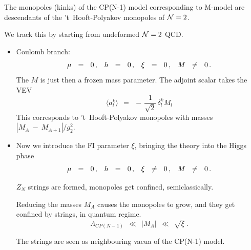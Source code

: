 \documentclass[12pt,letterpaper,landscape,KOMA,smallheadings,calcdimensions,display]{powersem}
\begin{document}
\begin{slide}

	The monopoles (kinks) of the CP(N-1) model corresponding to M-model are descendants
	of the 't~Hooft-Polyakov monopoles of $ \mathcal{N}=2 $.

	We track this by starting from undeformed $ \mathcal{N}=2 $ QCD.

\begin{itemize}
\item
	Coulomb branch:
\[
	\mu ~~=~~ 0\,\text, \quad h ~~=~~ 0\,\text, \quad \xi ~~=~~ 0 \,\text, \quad  M ~~\neq~~ 0\,\text{.}
\]
	The $M$ is just then a frozen mass parameter.
	The adjoint scalar takes the VEV
\[
	\langle a_l^k \rangle ~~=~~ -\,\frac{1}{\sqrt{2}}\, \delta^k_l M_l
\]
	This corresponds to 't~Hooft-Polyakov monopoles with masses $ |M_A ~-~ M_{A+1}|/g_2^2 $.
\end{itemize}

\end{slide}


\begin{slide}
\begin{itemize}
\item
	Now we introduce the FI parameter $\xi$, bringing the theory into the Higgs phase
\[
	\mu ~~=~~ 0\,\text, \quad h ~~=~~ 0\,\text, \quad \xi ~~\neq~~ 0 \,\text, \quad  M ~~\neq~~ 0\,\text{.}
\]

	$Z_N$ strings are formed, monopoles get confined, semiclassically.

	Reducing the masses $ M_A $ causes the monopoles to grow, and they get confined by strings,
	in quantum regime.
\[
	\Lambda_{CP(N-1)} ~~\ll~~ |M_A| ~~\ll~~ \sqrt{\xi}~.
\]

	The strings are seen as neighbouring vacua of the CP(N-1) model.

\end{itemize}

\end{slide}
\end{document}
